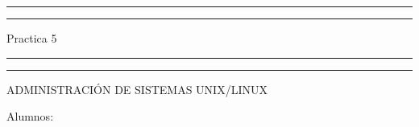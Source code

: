 \documentclass[a4paper, 11pt, oneside]{article}
\begin{document}
 

\begin{titlepage} 

	\centering 
	
	\scshape 
	
	\vspace*{\baselineskip} 
	
	
	
	\rule{\textwidth}{1.6pt}\vspace*{-\baselineskip}\vspace*{2pt} 
	\rule{\textwidth}{0.4pt} 
	
	\vspace{0.75\baselineskip} 
	
	{\LARGE Practica 5}	
	\vspace{0.75\baselineskip} 
	
	\rule{\textwidth}{0.4pt}\vspace*{-\baselineskip}\vspace{3.2pt}
	\rule{\textwidth}{1.6pt} 
	
	\vspace{2\baselineskip} 
	

	ADMINISTRACIÓN DE SISTEMAS UNIX/LINUX
	
	\vspace*{1\baselineskip} 
	
	
	
	Alumnos:
	
	\vspace{0.2\baselineskip} 
	

\end{titlepage}
\end{document}
